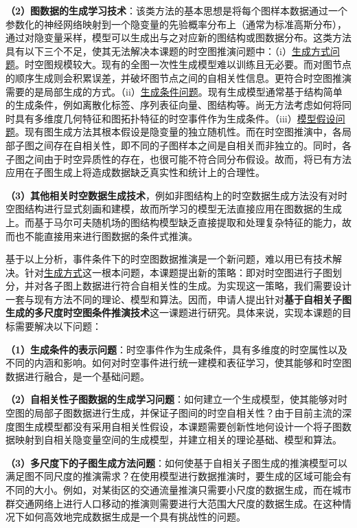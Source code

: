 \textbf{（2）图数据的生成学习技术}：该类方法的基本思想是将每个图样本数据通过一个参数化的神经网络映射到一个隐变量的先验概率分布上（通常为标准高斯分布），通过对隐变量采样，模型可以生成出与之对应新的图结构或图数据分布。这类方法具有以下三个不足，使其无法解决本课题的时空图推演问题中：（i）\underline{生成方式问题}。时空图规模较大。现有的全图一次性生成模型难以训练且无必要。而对图节点的顺序生成则会积累误差，并破坏图节点之间的自相关性信息。更符合时空图推演需要的是局部生成的方式。（ii）\underline{生成条件问题}。现有生成模型通常基于结构简单的生成条件，例如离散化标签、序列表征向量、图结构等。尚无方法考虑如何将同时具有多维度几何特征和图拓扑特征的时空事件作为生成条件。（iii）\underline{模型假设问题}。现有图生成方法其根本假设是隐变量的独立随机性。而在时空图推演中，各局部子图之间存在自相关性，即不同的子图样本之间是自相关而非独立的。同时，各子图之间由于时空异质性的存在，也很可能不符合同分布假设。故而，将已有方法应用在子图生成上将造成数据缺乏真实性和统计上的合理性。

\textbf{（3）其他相关时空数据生成技术}，例如非图结构上的时空数据生成方法没有对时空图结构进行显式刻画和建模，故而所学习的模型无法直接应用在图数据的生成上。而基于马尔可夫随机场的图结构模型缺乏直接提取和处理复杂特征的能力，故而也不能直接用来进行图数据的条件式推演。


基于以上分析，事件条件下的时空图数据推演是一个新问题，难以用已有技术解决。针对\underline{生成方式}这一根本问题，本课题提出新的策略：即对时空图进行子图划分，并对各子图上数据进行符合自相关性的生成。为实现这一策略，我们需要设计一套与现有方法不同的理论、模型和算法。因而，申请人提出针对\textbf{基于自相关子图生成的多尺度时空图条件推演技术}这一课题进行研究。具体来说，实现本课题的目标需要解决以下问题：

\textbf{（1）生成条件的表示问题}：时空事件作为生成条件，具有多维度的时空属性以及不同的内涵和影响。如何对时空事件进行统一建模和表征学习，使其能够和时空图数据进行融合，是一个基础问题。

\textbf{（2）自相关性子图数据的生成学习问题}：如何建立一个生成模型，使其能够对时空图的局部子图数据进行生成，并保证子图间的时空自相关性？由于目前主流的深度图生成模型都没有采用自相关性假设，本课题需要创新性地何设计一个将子图数据映射到自相关隐变量空间的生成模型，并建立相关的理论基础、模型和算法。

\textbf{（3）多尺度下的子图生成方法问题}：如何使基于自相关子图生成的推演模型可以满足图不同尺度的推演需求？在使用模型进行数据推演时，要生成的区域可能会有不同的大小。例如，对某街区的交通流量推演只需要小尺度的数据生成，而在城市群交通网络上进行人口移动的推演则需要进行大范围大尺度的数据生成。在这种情况下如何高效地完成数据生成是一个具有挑战性的问题。

